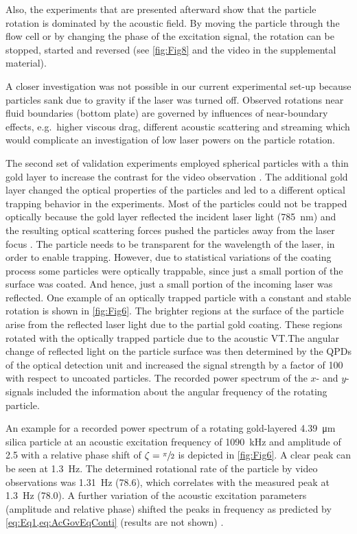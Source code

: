 Also, the experiments that are presented afterward show that the particle 
rotation is dominated by the acoustic field. By moving the particle through the 
flow cell or by changing the phase of the excitation signal, the rotation can be 
stopped, started and reversed (see \cref{fig:Fig8} and the video in the 
supplemental material).

A closer investigation was not possible in our current experimental set-up 
because particles sank due to gravity if the laser was turned off. Observed 
rotations near fluid boundaries (bottom plate) are governed by influences of 
near-boundary effects, e.g.\ higher viscous drag, different acoustic scattering 
and streaming which would complicate an investigation of low laser powers on the 
particle rotation.

The second set of validation experiments employed spherical particles with a 
thin gold layer to increase the contrast for the video observation 
\cite{Lamprecht}. The additional gold layer changed the optical properties of 
the particles and led to a different optical trapping behavior in the 
experiments. Most of the particles could not be trapped optically because the 
gold layer reflected the incident laser light (\SI{785}{\nano\meter}) and the 
resulting optical scattering forces pushed the particles away from the laser 
focus \cite{Mousavi2019,ashkin1992,Svoboda}. The particle needs to be 
transparent for the wavelength of the laser, in order to enable trapping. 
However, due to statistical variations of the coating process some particles 
were optically trappable, since just a small portion of the surface was coated.  
And hence, just a small portion of the incoming laser was reflected. One example 
of an optically trapped particle with a constant and stable rotation is shown in 
\cref{fig:Fig6}. The brighter regions at the surface of the particle arise from 
the reflected laser light due to the partial gold coating.  These regions 
rotated with the optically trapped particle due to the acoustic VT.\@ The 
angular change of reflected light on the particle surface was then determined by 
the QPDs of the optical detection unit and increased the signal strength by a 
factor of 100 with respect to uncoated particles. The recorded power spectrum of 
the $x$- and $y$-signals included the information about the angular frequency of 
the rotating particle.

An example for a recorded power spectrum of a rotating gold-layered 
\SI{4.39}{\micro\meter} silica particle at an acoustic excitation frequency of 
\SI{1090}{\kilo\hertz} and amplitude of \SI{2.5}{\Vrms} with a relative phase 
shift of $\zeta= \sfrac{\pi}{2}$ is depicted in \cref{fig:Fig6}. A clear peak 
can be seen at \SI{1.3}{\hertz}. The determined rotational rate of the particle 
by video observations was \SI{1.31}{\hertz} (\SI{78.6}{\rpm}), which correlates 
with the measured peak at \SI{1.3}{\hertz} (\SI{78.0}{\rpm}).  A further 
variation of the acoustic excitation parameters (amplitude and relative phase) 
shifted the peaks in frequency as predicted by \cref{eq:Eq1,eq:AcGovEqConti} 
(results are not shown) \cite{Lamprecht}.

